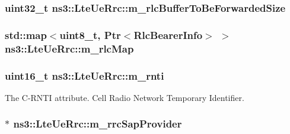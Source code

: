 \subsubsection[{\texorpdfstring{m\+\_\+rlc\+Buffer\+To\+Be\+Forwarded\+Size}{m_rlcBufferToBeForwardedSize}}]{\setlength{\rightskip}{0pt plus 5cm}uint32\+\_\+t ns3\+::\+Lte\+Ue\+Rrc\+::m\+\_\+rlc\+Buffer\+To\+Be\+Forwarded\+Size\hspace{0.3cm}{\ttfamily [private]}}\hypertarget{classns3_1_1LteUeRrc_afb37a53dac05a0ae624acab488e33d6f}{}\label{classns3_1_1LteUeRrc_afb37a53dac05a0ae624acab488e33d6f}
\subsubsection[{\texorpdfstring{m\+\_\+rlc\+Map}{m_rlcMap}}]{\setlength{\rightskip}{0pt plus 5cm}std\+::map$<$uint8\+\_\+t, {\bf Ptr}$<${\bf Rlc\+Bearer\+Info}$>$ $>$ ns3\+::\+Lte\+Ue\+Rrc\+::m\+\_\+rlc\+Map\hspace{0.3cm}{\ttfamily [private]}}\hypertarget{classns3_1_1LteUeRrc_a64b3948cda818827b8774d7a2be7ea4f}{}\label{classns3_1_1LteUeRrc_a64b3948cda818827b8774d7a2be7ea4f}
\subsubsection[{\texorpdfstring{m\+\_\+rnti}{m_rnti}}]{\setlength{\rightskip}{0pt plus 5cm}uint16\+\_\+t ns3\+::\+Lte\+Ue\+Rrc\+::m\+\_\+rnti\hspace{0.3cm}{\ttfamily [private]}}\hypertarget{classns3_1_1LteUeRrc_a8e078d8ef0ad23e670fe2ef08caab84f}{}\label{classns3_1_1LteUeRrc_a8e078d8ef0ad23e670fe2ef08caab84f}
The {\ttfamily C-\/\+R\+N\+TI} attribute. Cell Radio Network Temporary Identifier. 
\subsubsection[{\texorpdfstring{m\+\_\+rrc\+Sap\+Provider}{m_rrcSapProvider}}]{$\ast$ ns3\+::\+Lte\+Ue\+Rrc\+::m\+\_\+rrc\+Sap\+Provider\hspace{0.3cm}{\ttfamily [private]}}\hypertarget{classns3_1_1LteUeRrc_a390a2ddfeab3abe021bbc35ad911d066}{}\label{classns3_1_1LteUeRrc_a390a2ddfeab3abe021bbc35ad911d066}
